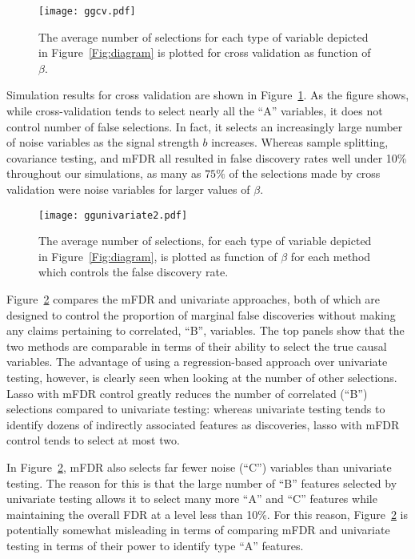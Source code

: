 \begin{figure} [!htb]
 \centering
  \texttt{[image: ggcv.pdf]}
  \caption{\label{Fig:cv} The average number of selections for each type of variable depicted in Figure~\ref{Fig:diagram} is plotted for cross validation as function of $\beta$.}
\end{figure}


Simulation results for cross validation are shown in Figure~\ref{Fig:cv}.  As the figure shows, while cross-validation tends to select nearly all the ``A'' variables, it does not control number of false selections.  In fact, it selects an increasingly large number of noise variables as the signal strength $b$ increases. Whereas sample splitting, covariance testing, and mFDR all resulted in false discovery rates well under 10\% throughout our simulations, as many as $75\%$ of the selections made by cross validation were noise variables for larger values of $\beta$.

\begin{figure} [!htb]
 \centering
  \texttt{[image: ggunivariate2.pdf]}
  \caption{\label{Fig:univariate} The average number of selections, for each type of variable depicted in Figure~\ref{Fig:diagram}, is plotted as function of $\beta$ for each method which controls the false discovery rate.}
\end{figure}

Figure~\ref{Fig:univariate} compares the mFDR and univariate approaches, both of which are designed to control the proportion of marginal false discoveries without making any claims pertaining to correlated, ``B'', variables. The top panels show that the two methods are comparable in terms of their ability to select the true causal variables.  The advantage of using a regression-based approach over univariate testing, however, is clearly seen when looking at the number of other selections.  Lasso with mFDR control greatly reduces the number of correlated (``B'') selections compared to univariate testing: whereas univariate testing tends to identify dozens of indirectly associated features as discoveries, lasso with mFDR control tends to select at most two.

In Figure~\ref{Fig:univariate}, mFDR also selects far fewer noise (``C'') variables than univariate testing.  The reason for this is that the large number of ``B'' features selected by univariate testing allows it to select many more ``A'' and ``C'' features while maintaining the overall FDR at a level less than 10\%.  For this reason, Figure~\ref{Fig:univariate} is potentially somewhat misleading in terms of comparing mFDR and univariate testing in terms of their power to identify type ``A'' features.

